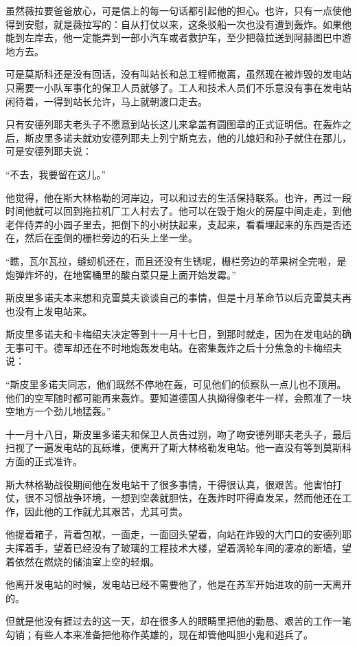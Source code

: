 虽然薇拉要爸爸放心，可是信上的每一句话都引起他的担心。也许，只有一点使他得到安慰，就是薇拉写的：自从打仗以来，这条驳船一次也没有遭到轰炸。如果他能到左岸去，他一定能弄到一部小汽车或者救护车，至少把薇拉送到阿赫图巴中游地方去。

可是莫斯科还是没有回话，没有叫站长和总工程师撤离，虽然现在被炸毁的发电站只需要一小队军事化的保卫人员就够了。工人和技术人员们不乐意没有事在发电站闲待着，一得到站长允许，马上就朝渡口走去。

只有安德列耶夫老头子不愿意到站长这儿来拿盖有圆图章的正式证明信。在轰炸之后，斯皮里多诺夫就劝安德列耶夫上列宁斯克去，他的儿媳妇和孙子就住在那儿，可是安德列耶夫说：

“不去，我要留在这儿。”

他觉得，他在斯大林格勒的河岸边，可以和过去的生活保持联系。也许，再过一段时间他就可以回到拖拉机厂工人村去了。他可以在毁于炮火的房屋中间走走，到他老伴侍弄的小园子里去，把倒下的小树扶起来，支起来，看看埋起来的东西是否还在，然后在歪倒的栅栏旁边的石头上坐一坐。

“瞧，瓦尔瓦拉，缝纫机还在，而且还没有生锈呢，栅栏旁边的苹果树全完啦，是炮弹炸坏的，在地窖桶里的酸白菜只是上面开始发霉。”

斯皮里多诺夫本来想和克雷莫夫谈谈自己的事情，但是十月革命节以后克雷莫夫再也没有上发电站来。

斯皮里多诺夫和卡梅绍夫决定等到十一月十七日，到那时就走，因为在发电站的确无事可干。德军却还在不时地炮轰发电站。在密集轰炸之后十分焦急的卡梅绍夫说：

“斯皮里多诺夫同志，他们既然不停地在轰，可见他们的侦察队一点儿也不顶用。他们的空军随时都可能再来轰炸。要知道德国人执拗得像老牛一样，会照准了一块空地方一个劲儿地猛轰。”

十一月十八日，斯皮里多诺夫和保卫人员告过别，吻了吻安德列耶夫老头子，最后扫视了一遍发电站的瓦砾堆，便离开了斯大林格勒发电站。他一直没有等到莫斯科方面的正式准许。

斯大林格勒战役期间他在发电站干了很多事情，干得很认真，很艰苦。他害怕打仗，很不习惯战争环境，一想到空袭就胆怯，在轰炸时吓得直发呆，然而他还在工作，因此他的工作就尤其艰苦，尤其可贵。

他提着箱子，背着包袱，一面走，一面回头望着，向站在炸毁的大门口的安德列耶夫挥着手，望着已经没有了玻璃的工程技术大楼，望着涡轮车间的凄凉的断墙，望着依然在燃烧的储油室上空的轻烟。

他离开发电站的时候，发电站已经不需要他了，他是在苏军开始进攻的前一天离开的。

但就是他没有捱过去的这一天，却在很多人的眼睛里把他的勤恳、艰苦的工作一笔勾销；有些人本来准备把他称作英雄的，现在却管他叫胆小鬼和逃兵了。

